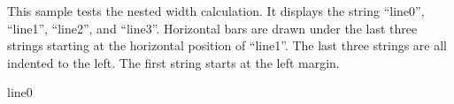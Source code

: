 \documentclass{article}
\begin{document}
This sample tests the nested width calculation. It displays the string
``line0'', ``line1'', ``line2'', and ``line3''. Horizontal bars are drawn
under the last three strings starting at the horizontal position of
``line1''. The last three strings are all indented to the left. The first
string starts at the left margin.
\vspace{2cm}

\begin{boxenv}
\begin{VBOX}{0}{3}
line0 

\lc
\end{VBOX}

\end{boxenv}
\end{document}

